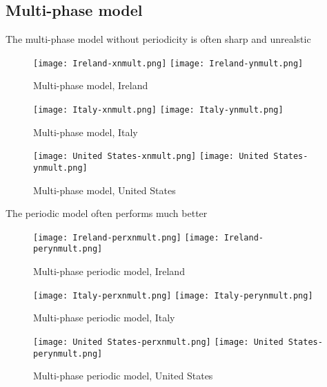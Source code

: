 \subsection{Multi-phase model}

The multi-phase model without periodicity is often sharp and unrealstic

\begin{figure}[H]
  \texttt{[image: Ireland-xnmult.png]} \label{fig:ireland-xnmult}
\endminipage\hfill
{}
  \texttt{[image: Ireland-ynmult.png]} \label{fig:ireland-ynmult}
\endminipage
\caption{Multi-phase model, Ireland}
\end{figure}

\begin{figure}[H]
  \texttt{[image: Italy-xnmult.png]} \label{fig:italy-xnmult}
\endminipage\hfill
{}
  \texttt{[image: Italy-ynmult.png]} \label{fig:italy-ynmult}
\endminipage
\caption{Multi-phase model, Italy}
\end{figure}

\begin{figure}[H]
  \texttt{[image: United States-xnmult.png]} \label{fig:usa-xnmult}
\endminipage\hfill
{}
  \texttt{[image: United States-ynmult.png]} \label{fig:usa-ynmult}
\endminipage
\caption{Multi-phase model, United States}
\end{figure}

The periodic model often performs much better

\begin{figure}[H]
  \texttt{[image: Ireland-perxnmult.png]} \label{fig:ireland-perxnmult}
\endminipage\hfill
{}
  \texttt{[image: Ireland-perynmult.png]} \label{fig:ireland-perynmult}
\endminipage
\caption{Multi-phase periodic model, Ireland}
\end{figure}

\begin{figure}[H]
  \texttt{[image: Italy-perxnmult.png]} \label{fig:italy-perxnmult}
\endminipage\hfill
{}
  \texttt{[image: Italy-perynmult.png]} \label{fig:italy-perynmult}
\endminipage
\caption{Multi-phase periodic model, Italy}
\end{figure}

\begin{figure}[H]
  \texttt{[image: United States-perxnmult.png]} \label{fig:usa-perxnmult}
\endminipage\hfill
{}
  \texttt{[image: United States-perynmult.png]} \label{fig:usa-perynmult}
\endminipage
\caption{Multi-phase periodic model, United States}
\end{figure}
